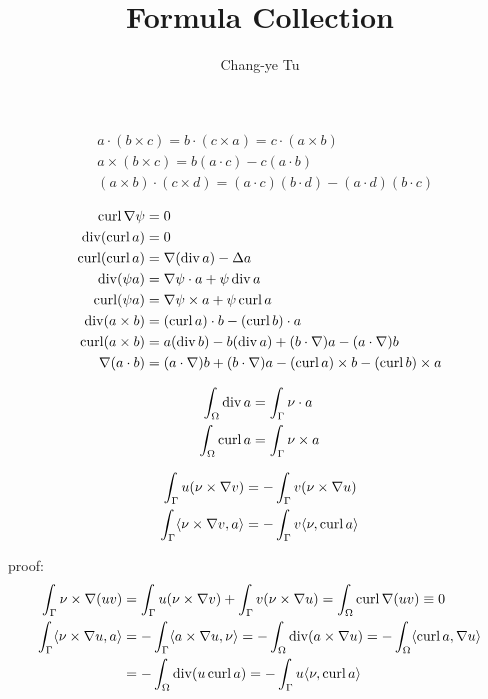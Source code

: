 
\title{Formula Collection}
\author{Chang-ye Tu}
\maketitle

\begin{align*}
  &a\cdot (b\times c) = b\cdot (c\times a) = c\cdot (a\times b) \\
  &a\times (b\times c) = b(a\cdot c) - c(a\cdot b) \\
  &(a\times b)\cdot(c\times d) = (a\cdot c)(b\cdot d) - (a\cdot d)(b\cdot c)
\end{align*}

\begin{align*}
  \operatorname{curl}\nabla\psi&= 0 \\
  \operatorname{div}(\operatorname{curl} a)&= 0 \\
  \operatorname{curl}(\operatorname{curl} a)&= \nabla(\operatorname{div} a) - \Delta a \\
  \operatorname{div}(\psi a)&= \nabla\psi\cdot a + \psi\operatorname{div} a \\
  \operatorname{curl}(\psi a)&= \nabla\psi\times a + \psi\operatorname{curl} a \\
  \operatorname{div}(a\times b)&= (\operatorname{curl} a)\cdot b - (\operatorname{curl} b)\cdot a \\
  \operatorname{curl}(a\times b)&= a(\operatorname{div} b) - b(\operatorname{div} a) + (b\cdot\nabla)a -(a\cdot\nabla)b \\
  \nabla(a\cdot b)&= (a\cdot\nabla)b + (b\cdot\nabla)a - (\operatorname{curl} a)\times b - (\operatorname{curl} b)\times a 
\end{align*}

\begin{align*}
  \int_{\Omega}\operatorname{div} a &= \int_{\Gamma}\nu\cdot a \\
  \int_{\Omega}\operatorname{curl} a &= \int_{\Gamma}\nu\times a
\end{align*}

\begin{align*}
  \int_{\Gamma}u(\nu\times\nabla v) &= -\int_{\Gamma}v(\nu\times\nabla u) \\
  \int_{\Gamma}\langle\nu\times\nabla v, a\rangle &= -\int_{\Gamma}v\langle\nu, \operatorname{curl} a\rangle \\
\end{align*}

proof: 
\begin{align*}
  \int_{\Gamma}\nu\times\nabla(uv) &= \int_{\Gamma}u(\nu\times\nabla v) + \int_{\Gamma}v(\nu\times\nabla u) = \int_{\Omega}\operatorname{curl}\nabla(uv) \equiv 0 \\
  \int_{\Gamma}\langle\nu\times\nabla u, a\rangle &= -\int_{\Gamma}\langle a\times\nabla u, \nu\rangle =-\int_{\Omega}\operatorname{div}(a\times\nabla u) =-\int_{\Omega}\langle\operatorname{curl} a, \nabla u\rangle \\ 
  &=-\int_{\Omega}\operatorname{div}(u\operatorname{curl} a) =-\int_{\Gamma}u\langle\nu,\operatorname{curl} a\rangle \\
\end{align*}

